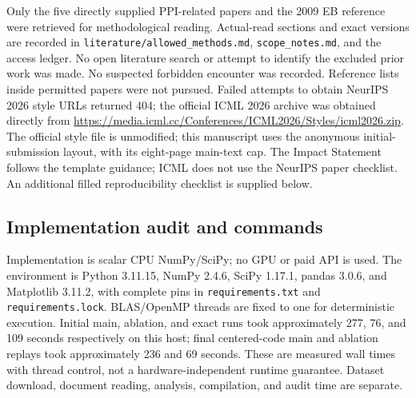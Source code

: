 \documentclass{article}
\begin{document}
Only the five directly supplied PPI-related papers and the 2009 EB reference were retrieved for methodological reading. Actual-read sections and exact versions are recorded in \texttt{literature/allowed\_methods.md}, \texttt{scope\_notes.md}, and the access ledger. No open literature search or attempt to identify the excluded prior work was made. No suspected forbidden encounter was recorded. Reference lists inside permitted papers were not pursued. Failed attempts to obtain NeurIPS 2026 style URLs returned 404; the official ICML 2026 archive was obtained directly from \url{https://media.icml.cc/Conferences/ICML2026/Styles/icml2026.zip}. The official style file is unmodified; this manuscript uses the anonymous initial-submission layout, with its eight-page main-text cap. The Impact Statement follows the template guidance; ICML does not use the NeurIPS paper checklist. An additional filled reproducibility checklist is supplied below.

\subsection{Implementation audit and commands}
Implementation is scalar CPU NumPy/SciPy; no GPU or paid API is used. The environment is Python 3.11.15, NumPy 2.4.6, SciPy 1.17.1, pandas 3.0.6, and Matplotlib 3.11.2, with complete pins in \texttt{requirements.txt} and \texttt{requirements.lock}. BLAS/OpenMP threads are fixed to one for deterministic execution. Initial main, ablation, and exact runs took approximately 277, 76, and 109 seconds respectively on this host; final centered-code main and ablation replays took approximately 236 and 69 seconds. These are measured wall times with thread control, not a hardware-independent runtime guarantee. Dataset download, document reading, analysis, compilation, and audit time are separate.
\end{document}

